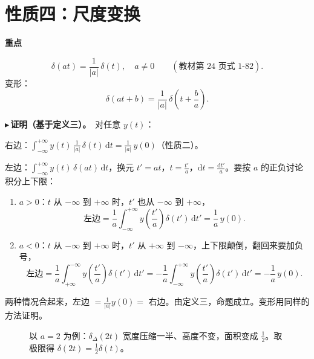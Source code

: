\documentclass[UTF8,a4paper,11pt]{ctexart}
\newenvironment{remember}{\begin{rememberbox}\textbf{重点}\par\smallskip}{\end{rememberbox}}
\newcommand{\taxes}[4][t]{%
  \draw[->] (#2,0) -- (#3,0) node[right,font=\scriptsize] {$#1$};
  \draw[->] (0,-0.3) -- (0,#4);
  \node[anchor=north east,font=\tiny,gray!60!black,inner sep=1pt] at (0,-0.02) {$0$};}
\newcommand{\xt}[2]{\draw (#1,0) -- (#1,-0.1) node[anchor=north,font=\tiny,gray!60!black,fill=white,inner sep=0.6pt] {$#2$};}
\newcommand{\yt}[2]{\draw (0,#1) -- (-0.1,#1) node[anchor=east,font=\tiny,gray!60!black,fill=white,inner sep=0.6pt] {$#2$};}
\newcounter{ex}[section]
\newcommand{\point}[1]{\par\addvspace{1ex}\noindent\textcolor{ptteal}{$\blacktriangleright$\,\textbf{#1}}\ }
\begin{document}
\section{性质四：尺度变换}\label{sec:p4}
\begin{remember}
\[
\delta(at)=\frac{1}{|a|}\,\delta(t),\quad a\ne0\qquad(\text{教材第 24 页式 1-82}).
\]
变形：
\[
\delta(at+b)=\frac{1}{|a|}\,\delta\!\left(t+\frac ba\right).
\]
\end{remember}

\point{证明（基于定义三）。}对任意 $y(t)$：

右边：$\displaystyle\int_{-\infty}^{+\infty}y(t)\,\frac1{|a|}\,\delta(t)\,\mathrm{d}t=\frac1{|a|}\,y(0)$（性质二）。

左边：$\displaystyle\int_{-\infty}^{+\infty}y(t)\,\delta(at)\,\mathrm{d}t$，换元 $t'=at$，$t=\frac{t'}a$，$\mathrm{d}t=\frac{\mathrm{d}t'}a$。要按 $a$ 的正负讨论积分上下限：
\begin{enumerate}[nosep]
\item $a>0$：$t$ 从 $-\infty$ 到 $+\infty$ 时，$t'$ 也从 $-\infty$ 到 $+\infty$，
\[
\text{左边}=\frac1a\int_{-\infty}^{+\infty}y\!\left(\frac{t'}a\right)\delta(t')\,\mathrm{d}t'=\frac1a\,y(0).
\]
\item $a<0$：$t$ 从 $-\infty$ 到 $+\infty$ 时，$t'$ 从 $+\infty$ 到 $-\infty$，上下限颠倒，翻回来要加负号，
\[
\text{左边}=\frac1a\int_{+\infty}^{-\infty}y\!\left(\frac{t'}a\right)\delta(t')\,\mathrm{d}t'
=-\frac1a\int_{-\infty}^{+\infty}y\!\left(\frac{t'}a\right)\delta(t')\,\mathrm{d}t'=-\frac1a\,y(0).
\]
\end{enumerate}
两种情况合起来，左边 $=\frac1{|a|}y(0)=$ 右边。由定义三，命题成立。变形用同样的方法证明。

\begin{figure}[H]
\centering
{}
\caption{以 $a=2$ 为例：$\delta_\Delta(2t)$ 宽度压缩一半、高度不变，面积变成 $\frac12$。取极限得 $\delta(2t)=\frac12\delta(t)$。}
\end{figure}
\end{document}
